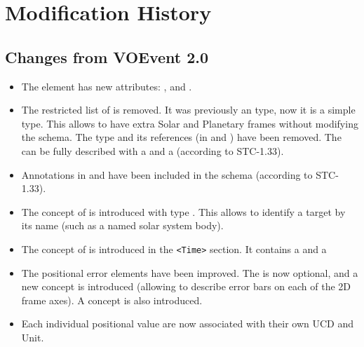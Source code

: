 \documentclass[11pt,a4paper]{ivoa}
\begin{document}


\appendix

\section{Modification History}
\subsection{Changes from VOEvent 2.0}
\label{appendix:last-changes}
\begin{itemize}
\item The  element has new attributes: ,
 and .
\item The restricted list of  is removed. It was
previously an  type, now it is a simple  type.
This allows to have extra Solar and Planetary frames without modifying the
schema. The  type and its references (in 
and ) have been removed. The  can
be fully described with a  and a   (according to
STC-1.33).
\item Annotations in  and 
have been included in the schema (according to STC-1.33).
\item The concept of  is introduced with
type . This allows to identify a target by its name (such as a named solar
system body).
\item The concept of  is introduced in the \verb|<Time>|
section. It contains a  and a 
\item The positional error elements have been improved. The  is now optional, and a new 
concept is introduced (allowing to describe error bars on each of the 2D frame
axes). A  concept is also introduced.
\item Each individual positional value are now associated with their own UCD
and Unit.
\end{itemize}
\end{document}
